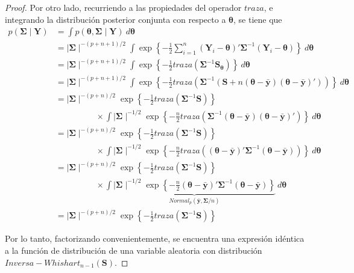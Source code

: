 \documentclass[
  10pt,
  spanish,
]{book}
\theoremstyle{definition}
\theoremstyle{definition}
\theoremstyle{definition}
\theoremstyle{definition}
\theoremstyle{remark}
\begin{document}
\begin{proof}
Por otro lado, recurriendo a las propiedades del operador \(traza\), e integrando la distribución posterior conjunta con respecto a \(\boldsymbol \theta\), se tiene que
\begin{align*}
p(\boldsymbol \Sigma\mid \mathbf{Y})&=\int p(\boldsymbol \theta,\boldsymbol \Sigma\mid \mathbf{Y}) \ d\boldsymbol \theta\\
&= \mid \boldsymbol \Sigma\mid ^{-(p+n+1)/2}\int\exp\left\{ -\frac{1}{2}\sum_{i=1}^n
  (\mathbf{Y}_i-\boldsymbol \theta)'\boldsymbol \Sigma^{-1}(\mathbf{Y}_i-\boldsymbol \theta)\right\} \ d\boldsymbol \theta\\
  &= \mid \boldsymbol \Sigma\mid ^{-(p+n+1)/2}\int
  \exp\left\{ -\frac{1}{2}traza(\boldsymbol \Sigma^{-1}\mathbf{S}_{\boldsymbol \theta})\right\} \ d\boldsymbol \theta\\
  &= \mid \boldsymbol \Sigma\mid ^{-(p+n+1)/2}\int
  \exp\left\{ -\frac{1}{2}traza(\boldsymbol \Sigma^{-1}
  (\mathbf{S}+n(\boldsymbol \theta-\bar{\mathbf{y}})(\boldsymbol \theta-\bar{\mathbf{y}})'))\right\} \ d\boldsymbol \theta\\
&= \mid \boldsymbol \Sigma\mid ^{-(p+n)/2}\exp\left\{ -\frac{1}{2}traza(\boldsymbol \Sigma^{-1}\mathbf{S})\right\}\\
&\hspace{2cm}\times
\int \mid \boldsymbol \Sigma\mid ^{-1/2}\exp\left\{ -\frac{n}{2}traza(\boldsymbol \Sigma^{-1}(\boldsymbol \theta-\bar{\mathbf{y}})(\boldsymbol \theta-\bar{\mathbf{y}})')\right\} \ d\boldsymbol \theta\\
&= \mid \boldsymbol \Sigma\mid ^{-(p+n)/2}\exp\left\{ -\frac{1}{2}traza(\boldsymbol \Sigma^{-1}\mathbf{S})\right\}\\
&\hspace{2cm}\times\int \mid \boldsymbol \Sigma\mid ^{-1/2}\exp\left\{ -\frac{n}{2}traza((\boldsymbol \theta-\bar{\mathbf{y}})'\boldsymbol \Sigma^{-1}(\boldsymbol \theta-\bar{\mathbf{y}}))\right\} \ d\boldsymbol \theta\\
&= \mid \boldsymbol \Sigma\mid ^{-(p+n)/2}\exp\left\{ -\frac{1}{2}traza(\boldsymbol \Sigma^{-1}\mathbf{S})\right\}\\
&\hspace{2cm}\times
\int\underbrace{ \mid \boldsymbol \Sigma\mid ^{-1/2}\exp\left\{ -\frac{n}{2}(\boldsymbol \theta-\bar{\mathbf{y}})'\boldsymbol \Sigma^{-1}(\boldsymbol \theta-\bar{\mathbf{y}})\right\}}_{Normal_p(\bar{\mathbf{y}},\boldsymbol \Sigma/n)} \ d\boldsymbol \theta\\
&= \mid \boldsymbol \Sigma\mid ^{-(p+n)/2}\exp\left\{ -\frac{1}{2}traza(\boldsymbol \Sigma^{-1}\mathbf{S})\right\}
\end{align*}

Por lo tanto, factorizando convenientemente, se encuentra una expresión idéntica a la función de distribución de una variable aleatoria con distribución \(Inversa-Whishart_{n-1}(\mathbf{S})\).
\end{proof}
\end{document}
